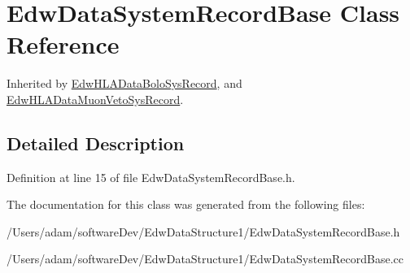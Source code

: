 \hypertarget{class_edw_data_system_record_base}{
\section{EdwDataSystemRecordBase Class Reference}
\label{class_edw_data_system_record_base}
}


Inherited by \hyperlink{class_edw_h_l_a_data_bolo_sys_record}{EdwHLADataBoloSysRecord}, and \hyperlink{class_edw_h_l_a_data_muon_veto_sys_record}{EdwHLADataMuonVetoSysRecord}.



\subsection{Detailed Description}


Definition at line 15 of file EdwDataSystemRecordBase.h.



The documentation for this class was generated from the following files:\begin{DoxyCompactItemize}
\item 
/Users/adam/softwareDev/EdwDataStructure1/EdwDataSystemRecordBase.h\item 
/Users/adam/softwareDev/EdwDataStructure1/EdwDataSystemRecordBase.cc\end{DoxyCompactItemize}

